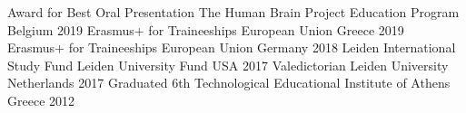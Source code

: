 



\begin{cvhonors}

  \cvhonor
    {Award for Best Oral Presentation} %
    {The Human Brain Project Education Program} %
    {Belgium} %
    {2019} %
   \cvhonor
	{Erasmus+ for Traineeships} %
	{European Union} %
	{Greece} %
	{2019} %
   \cvhonor
	{Erasmus+ for Traineeships} %
	{European Union} %
	{Germany} %
	{2018} %
   \cvhonor
	{Leiden International Study Fund} %
	{Leiden University Fund} %
	{USA} %
	{2017} %
   \cvhonor
	{Valedictorian} %
	{Leiden University} %
	{Netherlands} %
	{2017} %
   \cvhonor
	{Graduated 6th} %
	{Technological Educational Institute of Athens} %
	{Greece} %
	{2012} %
\end{cvhonors}





